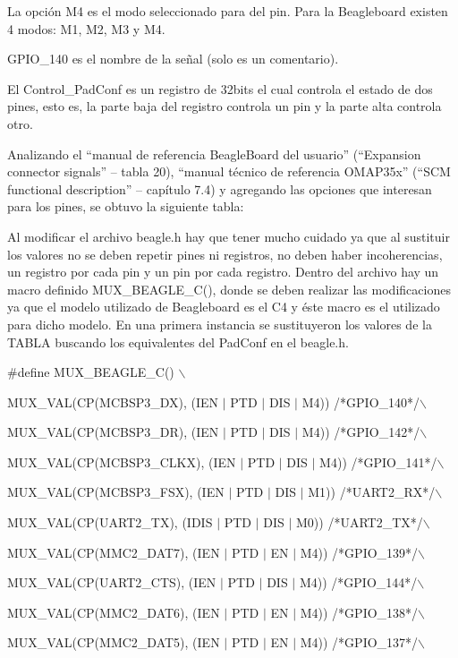 La opción M4 es el modo seleccionado para del pin. Para la Beagleboard existen 4 modos: M1, M2, M3 y M4.

GPIO\_140 es el nombre de la señal (solo es un comentario). 

\bigskip
El Control\_PadConf es un registro de 32bits el cual controla el estado de dos pines, esto es, la parte 
baja del registro controla un pin y la parte alta controla otro. 

\bigskip
Analizando el “manual de referencia BeagleBoard del usuario” (“Expansion connector signals” – 
tabla 20), “manual técnico de referencia OMAP35x” (“SCM functional description” – capítulo 7.4) 
y agregando las opciones que interesan para los pines, se obtuvo la siguiente tabla: 

\bigskip
Al modificar el archivo beagle.h hay que tener mucho cuidado ya que al sustituir los valores no se deben repetir pines ni registros, no deben haber incoherencias, un registro por cada pin y un pin por cada registro. 
Dentro del archivo hay un macro definido MUX\_BEAGLE\_C(), donde se deben realizar las modificaciones ya que el modelo utilizado de Beagleboard es el C4 y éste macro es el utilizado para dicho modelo.
En una primera instancia se sustituyeron los valores de la TABLA buscando los equivalentes del 
PadConf en el beagle.h. 

\bigskip
\#define MUX\_BEAGLE\_C() $\backslash$  

MUX\_VAL(CP(MCBSP3\_DX),	(IEN  $|$ PTD $|$ DIS $|$ M4)) /*GPIO\_140*/$\backslash$  

MUX\_VAL(CP(MCBSP3\_DR),	(IEN  $|$ PTD $|$ DIS $|$ M4)) /*GPIO\_142*/$\backslash$  

MUX\_VAL(CP(MCBSP3\_CLKX),	(IEN  $|$ PTD $|$ DIS $|$ M4)) /*GPIO\_141*/$\backslash$  

MUX\_VAL(CP(MCBSP3\_FSX),	(IEN  $|$ PTD $|$ DIS $|$ M1)) /*UART2\_RX*/$\backslash$  

MUX\_VAL(CP(UART2\_TX),		(IDIS $|$ PTD $|$ DIS $|$ M0)) /*UART2\_TX*/$\backslash$  

MUX\_VAL(CP(MMC2\_DAT7),	(IEN  $|$ PTD $|$ EN  $|$ M4)) /*GPIO\_139*/$\backslash$  

MUX\_VAL(CP(UART2\_CTS),	(IEN  $|$ PTD $|$ DIS $|$ M4)) /*GPIO\_144*/$\backslash$  

MUX\_VAL(CP(MMC2\_DAT6),	(IEN  $|$ PTD $|$ EN  $|$ M4)) /*GPIO\_138*/$\backslash$  

MUX\_VAL(CP(MMC2\_DAT5),	(IEN  $|$ PTD $|$ EN  $|$ M4)) /*GPIO\_137*/$\backslash$  

